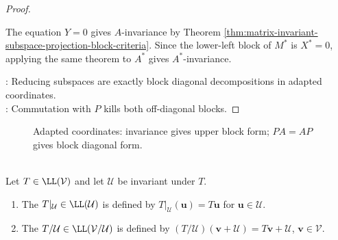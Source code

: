 \begin{corollary}
\begin{proof}
\begin{enumerate}[label=(\roman*).]
The equation $Y=0$ gives $A$-invariance by Theorem \ref{thm:matrix-invariant-subspace-projection-block-criteria}. Since the lower-left block of $M^*$ is $X^*=0$, applying the same theorem to $A^*$ gives $A^*$-invariance.
\end{enumerate}
: Reducing subspaces are exactly block diagonal decompositions in adapted coordinates.\\
: Commutation with $P$ kills both off-diagonal blocks.
\end{proof}
\end{corollary}

\begin{figure}[H]
  \centering
  
  \caption{Adapted coordinates: invariance gives upper block form; $PA=AP$ gives block diagonal form.}
  \label{fig:invariant-projection-block-form}
\end{figure}

\begin{definition} \label{def:restriction-and-quotient-operators} \\
Let $T\in\LL(\mathcal{V})$ and let $\mathcal{U}$ be invariant under $T$.
\begin{enumerate}[label=(\roman*)]
\setlength{\itemsep}{0pt}
\item The  $T|_{\mathcal{U}}\in\LL(\mathcal{U})$ is defined by $T|_{\mathcal{U}}(\mathbf{u})=T\mathbf{u}$ for $\mathbf{u}\in\mathcal{U}$.
\item The  $T/\mathcal{U}\in\LL(\mathcal{V}/\mathcal{U})$ is defined by $(T/\mathcal{U})(\mathbf{v}+\mathcal{U})=T\mathbf{v}+\mathcal{U}$, $\mathbf{v}\in\mathcal{V}$.
\end{enumerate}
\end{definition}

